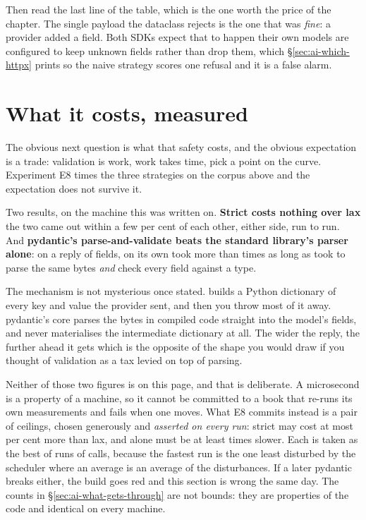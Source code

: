 Then read the last line of the table, which is the one worth the price of
the chapter. The single payload the dataclass rejects is the one that was
\emph{fine}: a provider added a field. Both SDKs expect that to happen
\dash{} their own models are configured to keep unknown fields rather than
drop them, which \S\ref{sec:ai-which-httpx} prints \dash{} so the naive
strategy scores one refusal and it is a false alarm.

\section{What it costs, measured}
\label{sec:ai-what-costs}

The obvious next question is what that safety costs, and the obvious
expectation is a trade: validation is work, work takes time, pick a point
on the curve. Experiment E8 times the three strategies on the corpus above
and the expectation does not survive it.

Two results, on the machine this was written on. \textbf{Strict costs
nothing over lax} \dash{} the two came out within a few per cent of each
other, either side, run to run. And \textbf{pydantic's parse-and-validate
beats the standard library's parser alone}: on a reply of
 fields,  on its own took more than
 times as long as  took to
parse the same bytes \emph{and} check every field against a type.

The mechanism is not mysterious once stated.  builds a
Python dictionary of every key and value the provider sent, and then you
throw most of it away. pydantic's core parses the bytes in compiled code
straight into the model's fields, and never materialises the intermediate
dictionary at all. The wider the reply, the further ahead it gets \dash{}
which is the opposite of the shape you would draw if you thought of
validation as a tax levied on top of parsing.

\begin{note}
Neither of those two figures is on this page, and that is deliberate. A
microsecond is a property of a machine, so it cannot be committed to a book
that re-runs its own measurements and fails when one moves. What E8 commits
instead is a pair of ceilings, chosen generously and \emph{asserted on every
run}: strict may cost at most  per cent more
than lax, and  alone must be at least
 times slower. Each is taken as the best of
 runs of  calls, because the fastest
run is the one least disturbed by the scheduler where an average is an
average of the disturbances. If a later pydantic breaks either, the
build goes red and this section is wrong the same day. The counts in
\S\ref{sec:ai-what-gets-through} are not bounds: they are properties of the
code and identical on every machine.
\end{note}

